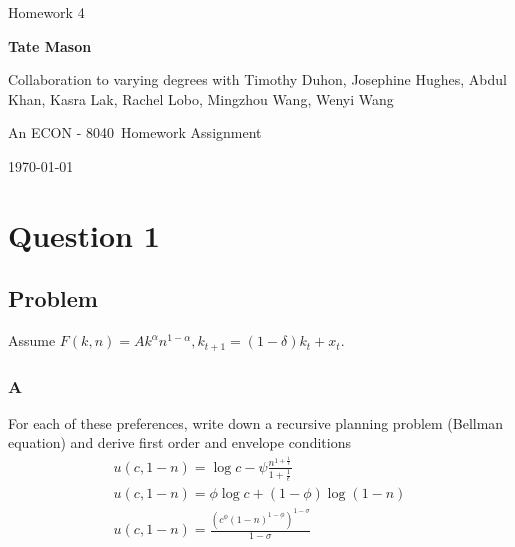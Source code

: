 \documentclass[10pt, a4paper]{article}
\newcommand\course{ECON - 8040}                            %
\newcommand\hwnumber{ 4}                                 %
\newcommand\Information{Tate Mason}                        %
\begin{document}
  \begin{titlepage}
    \begin{center}
      \vspace*{3cm}
            
        \vspace{1cm}
        \huge
        Homework \hwnumber
            
        \vspace{1.5cm}
        \Large
            
        \textbf{\Information}                      %
            
        \vfill
        Collaboration to varying degrees with Timothy Duhon, Josephine Hughes, Abdul Khan, Kasra Lak, Rachel Lobo, Mingzhou Wang, Wenyi Wang
        
        \vspace{1cm}

        An \course \ Homework Assignment
            
        \vspace{1cm}
        \Large

        
        \today
            
    \end{center}
  \end{titlepage}

  \newpage
  \section*{Question 1}
    \subsection*{Problem}
    Assume $F(k,n) = Ak^{\alpha}n^{1-\alpha}, k_{t+1}=(1-\delta)k_t + x_t$.

    \subsubsection*{A} For each of these preferences, write down a recursive planning problem (Bellman equation) and derive first order and envelope conditions
    \begin{align*}
      u(c, 1-n) = \log c - \psi\frac{n^{1+\frac{1}{\epsilon}}}{1+\frac{1}{\epsilon}} \\
      u(c, 1-n) = \phi\log c+(1-\phi)\log(1-n) \\
      u(c, 1-n) = \frac{(c^{\phi}(1-n)^{1-\phi})^{1-\sigma}}{1-\sigma} \\
    \end{align*}
\end{document}
